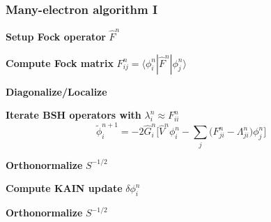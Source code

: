\begin{frame}
    \frametitle{Many-electron algorithm I}
    \centering
    \textbf{Setup Fock operator} $\hat{F}^n$

    \vspace{5mm}

    \textbf{Compute Fock matrix} $F_{ij}^n = \langle\phi_i^n|\hat{F}^n|\phi_j^n\rangle$

    \vspace{5mm}

    \textbf{Diagonalize/Localize}

    \vspace{5mm}

    \textbf{Iterate BSH operators with} $\lambda_i^n \approx F_{ii}^n$
    \begin{equation}
	\nonumber
        \tilde{\phi}_i^{n+1} = -2\hat{G}_i^n \bigg[\hat{V}^n\phi_i^n -
        \sum_j\big(F_{ji}^n - \Lambda_{ji}^n\big)\phi_j^n\bigg]
    \end{equation}

    \vspace{2mm}

    \textbf{Orthonormalize} $S^{-1/2}$

    \vspace{5mm}

    \textbf{Compute KAIN update} $\delta\phi_i^n$

    \vspace{5mm}

    \textbf{Orthonormalize} $S^{-1/2}$

\end{frame}

